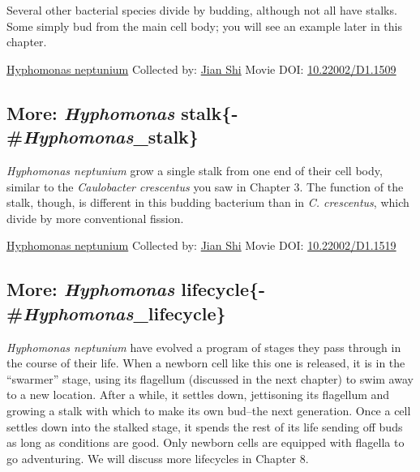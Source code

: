 \documentclass[]{tufte-book}
\begin{document}
Several other bacterial species divide by budding, although not all have stalks. Some simply bud from the main cell body; you will see an example later in this chapter.



\hypertarget{htmlwidget-fa0296cc787a566cab84}{}

\label{fig:5-3}\protect\hyperlink{tree}{Hyphomonas neptunium} Collected by: \protect\hyperlink{jian_shi}{Jian Shi} Movie DOI: \href{https://doi.org/10.22002/D1.1509}{10.22002/D1.1509}

\hypertarget{more-hyphomonas-stalk-hyphomonas_stalk}{%
\subsection{\texorpdfstring{More: \emph{Hyphomonas} stalk\{-\#\emph{Hyphomonas}\_stalk\}}{More: Hyphomonas stalk\{-\#Hyphomonas\_stalk\}}}\label{more-hyphomonas-stalk-hyphomonas_stalk}}

\emph{Hyphomonas neptunium} grow a single stalk from one end of their cell body, similar to the \emph{Caulobacter crescentus} you saw in Chapter 3. The function of the stalk, though, is different in this budding bacterium than in \emph{C. crescentus}, which divide by more conventional fission.



\hypertarget{htmlwidget-e27b43ec2297a1edf5fd}{}

\label{fig:5-3a}\protect\hyperlink{tree}{Hyphomonas neptunium} Collected by: \protect\hyperlink{jian_shi}{Jian Shi} Movie DOI: \href{https://doi.org/10.22002/D1.1519}{10.22002/D1.1519}

\hypertarget{more-hyphomonas-lifecycle-hyphomonas_lifecycle}{%
\subsection{\texorpdfstring{More: \emph{Hyphomonas} lifecycle\{-\#\emph{Hyphomonas}\_lifecycle\}}{More: Hyphomonas lifecycle\{-\#Hyphomonas\_lifecycle\}}}\label{more-hyphomonas-lifecycle-hyphomonas_lifecycle}}

\emph{Hyphomonas neptunium} have evolved a program of stages they pass through in the course of their life. When a newborn cell like this one is released, it is in the ``swarmer'' stage, using its flagellum (discussed in the next chapter) to swim away to a new location. After a while, it settles down, jettisoning its flagellum and growing a stalk with which to make its own bud--the next generation. Once a cell settles down into the stalked stage, it spends the rest of its life sending off buds as long as conditions are good. Only newborn cells are equipped with flagella to go adventuring. We will discuss more lifecycles in Chapter 8.
\end{document}
